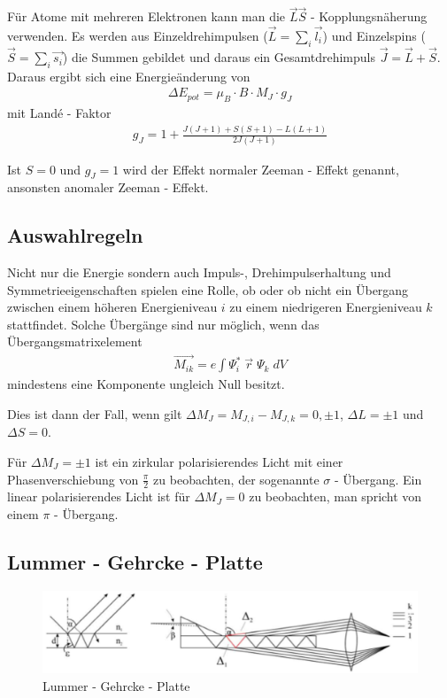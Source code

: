 \documentclass[11pt,a4paper]{article}
\begin{document}
Für Atome mit mehreren Elektronen kann man die $\vec{L} \vec{S}$ - Kopplungsnäherung verwenden. Es werden aus Einzeldrehimpulsen ($\vec{L} = \sum_i \vec{l_i}$) und Einzelspins ($\vec{S} = \sum_i \vec{s_i}$) die Summen gebildet und daraus ein Gesamtdrehimpuls $\vec{J} = \vec{L} + \vec{S}$. Daraus ergibt sich eine Energieänderung von
\begin{align}
	\Delta E_{pot} = \mu_B \cdot B \cdot M_J \cdot g_J
\end{align}
mit Landé - Faktor
\begin{align}
	g_J = 1 + \frac{J(J + 1) + S(S + 1) - L(L + 1)}{2J(J + 1)}
\end{align}

Ist $S = 0$ und $g_J = 1$ wird der Effekt normaler Zeeman - Effekt genannt, ansonsten anomaler Zeeman - Effekt.

\subsection{Auswahlregeln}
Nicht nur die Energie sondern auch Impuls-, Drehimpulserhaltung und Symmetrieeigenschaften spielen eine Rolle, ob oder ob nicht ein Übergang zwischen einem höheren Energieniveau $i$ zu einem niedrigeren Energieniveau $k$ stattfindet. Solche Übergänge sind nur möglich, wenn das Übergangsmatrixelement
\begin{align}
	\vec{M_{ik}} = e \int \Psi_i^* \; \vec{r} \; \Psi_k \; dV
\end{align}
mindestens eine Komponente ungleich Null besitzt.

Dies ist dann der Fall, wenn gilt $\Delta M_J = M_{J,i} - M_{J,k} = 0, \pm 1$, $\Delta L = \pm 1$ und $\Delta S = 0$.

Für $\Delta M_J = \pm 1$ ist ein zirkular polarisierendes Licht mit einer Phasenverschiebung von $\frac{\pi}{2}$ zu beobachten, der sogenannte $\sigma$ - Übergang. Ein linear polarisierendes Licht ist für $\Delta M_J = 0$ zu beobachten, man spricht von einem $\pi$ - Übergang.

\subsection{Lummer - Gehrcke - Platte}
\begin{figure}[h]
	\centering
	\includegraphics[scale=0.5]{lummerGehrckePlate.png}
	\caption{Lummer - Gehrcke - Platte}\label{fig:lummerGehrckePlatte}
\end{figure}
\end{document}
